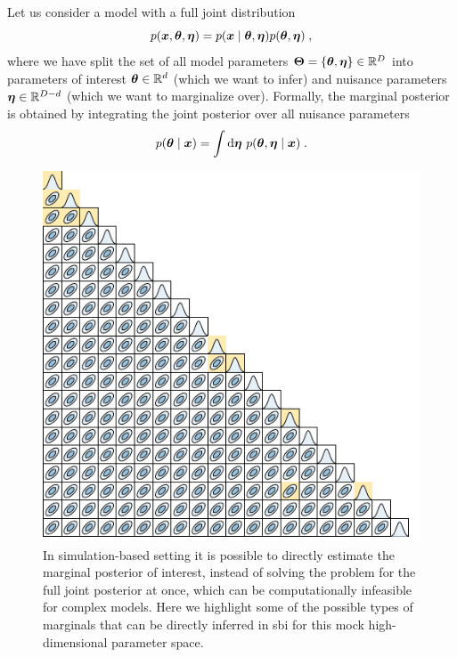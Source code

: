 Let us consider a model with a full joint distribution
\begin{equation}
	p(\bm{x},\bm{\theta}, \bm{\eta}) = p(\bm{x}\mid\bm{\theta}, \bm{\eta})p(\bm{\theta}, \bm{\eta}) \;,
\end{equation} 
where we have split the set of all model parameters $\bm{\Theta} = \{\bm{\theta},\bm{\eta}\} \in \mathbb{R}^D$ into parameters of interest $\bm{\theta} \in \mathbb{R}^d$ (which we want to infer) and nuisance parameters $\bm{\eta} \in \mathbb{R}^{D-d}$ (which we want to marginalize over). 
Formally, the marginal posterior is obtained by integrating the joint posterior over all nuisance parameters
\begin{equation}
	p(\interest \mid \data) = \int \dd\nuisance\ p(\interest, \nuisance \mid \data) \;.
\end{equation}


\begin{figure}
    \centering
	\includegraphics[width=\linewidth]{TikZ/corner.pdf}
    \caption{In simulation-based setting it is possible to directly estimate the marginal posterior of interest, instead of solving the problem for the full joint posterior at once, which can be computationally infeasible for complex models. Here we highlight some of the possible types of marginals that can be directly inferred in \gls*{sbi} for this mock high-dimensional parameter space.}
    \label{fig:sbi-marginals}
\end{figure}


